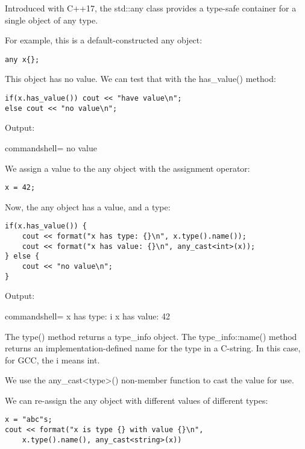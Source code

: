 
Introduced with C++17, the std::any class provides a type-safe container for a single object of any type.

For example, this is a default-constructed any object:

\begin{lstlisting}[style=styleCXX]
any x{};
\end{lstlisting}

This object has no value. We can test that with the has\_value() method:

\begin{lstlisting}[style=styleCXX]
if(x.has_value()) cout << "have value\n";
else cout << "no value\n";
\end{lstlisting}

Output:

\begin{tcblisting}{commandshell={}}
no value
\end{tcblisting}

We assign a value to the any object with the assignment operator:

\begin{lstlisting}[style=styleCXX]
x = 42;
\end{lstlisting}

Now, the any object has a value, and a type:

\begin{lstlisting}[style=styleCXX]
if(x.has_value()) {
	cout << format("x has type: {}\n", x.type().name());
	cout << format("x has value: {}\n", any_cast<int>(x));
} else {
	cout << "no value\n";
}
\end{lstlisting}

Output:

\begin{tcblisting}{commandshell={}}
x has type: i
x has value: 42
\end{tcblisting}

The type() method returns a type\_info object. The type\_info::name() method returns an implementation-defined name for the type in a C-string. In this case, for GCC, the i means int.

We use the any\_cast<type>() non-member function to cast the value for use.

We can re-assign the any object with different values of different types:

\begin{lstlisting}[style=styleCXX]
x = "abc"s;
cout << format("x is type {} with value {}\n",
	x.type().name(), any_cast<string>(x))
\end{lstlisting}

